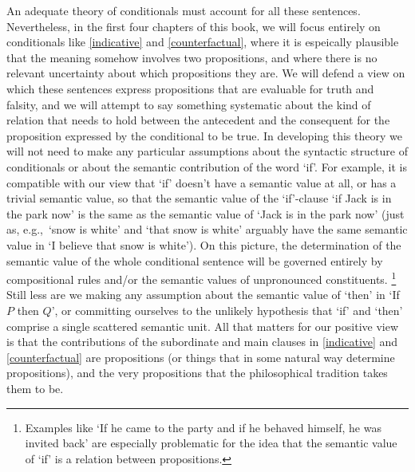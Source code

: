 \documentclass[If.tex]{subfiles}
\begin{document}
An adequate theory of conditionals must account for all these sentences. Nevertheless, in the first four chapters of this book, we will focus entirely on conditionals like \ref{indicative} and \ref{counterfactual}, where it is espeically plausible that the meaning somehow involves two propositions, and where there is no relevant uncertainty about which propositions they are. We will defend a view on which these sentences express propositions that are evaluable for truth and falsity, and we will attempt to say something systematic about the kind of relation that needs to hold between the antecedent and the consequent for the proposition expressed by the conditional to be true. In developing this theory we will not need to make any particular assumptions about the syntactic structure of conditionals or about the semantic contribution of the word ‘if’. For example, it is compatible with our view that ‘if’ doesn't have a semantic value at all, or has a trivial semantic value, so that the semantic value of the ‘if’-clause ‘if Jack is in the park now’ is the same as the semantic value of ‘Jack is in the park now’ (just as, e.g.,\ ‘snow is white’ and ‘that snow is white’ arguably have the same semantic value in ‘I believe that snow is white’).  On this picture, the determination of the semantic value of the whole conditional sentence will be governed entirely by compositional rules and/or the semantic values of unpronounced constituents.%
\footnote{Examples like ‘If he came to the party and if he behaved himself, he was invited back’ are especially problematic for the idea that the semantic value of ‘if’ is a relation between propositions.}
Still less are we making any assumption about the semantic value of ‘then’ in ‘If $P$ then $Q$’, or committing ourselves to the unlikely hypothesis that ‘if’ and ‘then’ comprise a single scattered semantic unit. All that matters for our positive view is that the contributions of the subordinate and main clauses in \ref{indicative} and \ref{counterfactual} are propositions (or things that in some natural way determine propositions), and the very propositions that the philosophical tradition takes them to be.%
\end{document}
